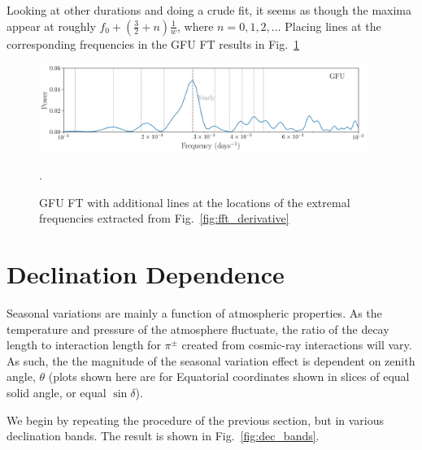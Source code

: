 Looking at other durations and doing a crude fit, it seems as though the maxima appear at roughly $f_0 + (\frac{3}{2} + n)\frac{1}{w}$, where $n = 0,1,2,\ldots$
Placing lines at the corresponding frequencies in the GFU FT results in Fig.~\ref{fig:gfu_with_harmonics}

\begin{figure}
    \centering
    \includegraphics[width=0.95\textwidth]{figures/seasonal/gfu_online_overall_FFT_maxima_True.png}
    \caption[FFT numerical derivative]{GFU FT with additional lines at the locations of the extremal frequencies extracted from Fig.~\ref{fig:fft_derivative}}.
    \label{fig:gfu_with_harmonics}
\end{figure}

\section{Declination Dependence}
Seasonal variations are mainly a function of atmospheric properties. As the temperature and pressure of the atmosphere fluctuate, the ratio of the decay length to interaction length for $\pi^{\pm}$ created from cosmic-ray interactions will vary. As such, the the magnitude of the seasonal variation effect is dependent on zenith angle, $\theta$ (plots shown here are for Equatorial coordinates shown in slices of equal solid angle, or equal $\sin \delta$). 

We begin by repeating the procedure of the previous section, but in various declination bands. The result is shown in Fig.~\ref{fig:dec_bands}.


